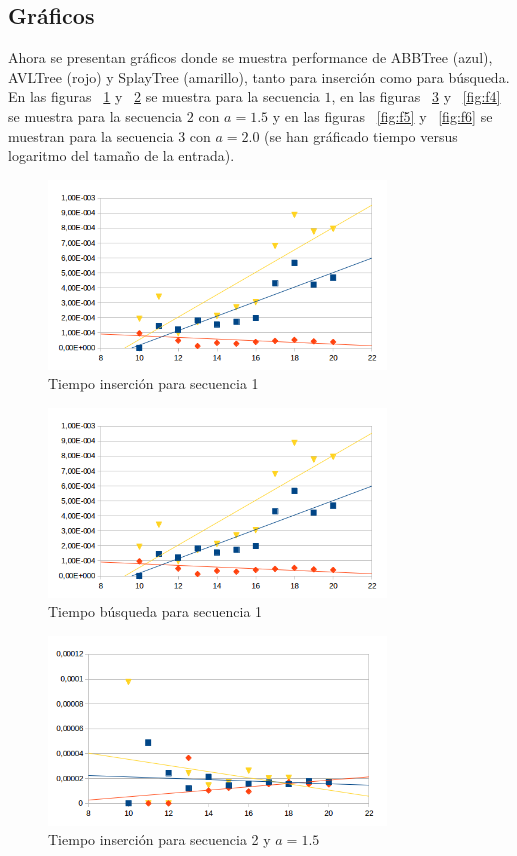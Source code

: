 \documentclass[letterpaper,12pt]{article}
\begin{document}
\newpage
\subsection{Gráficos}
Ahora se presentan gr\'aficos donde se muestra performance de ABBTree (azul), AVLTree (rojo) y SplayTree (amarillo), tanto para inserci\'on como para b\'usqueda. En las figuras ~\ref{fig:f1} y ~\ref{fig:f2} se muestra para la secuencia $1$, en las figuras ~\ref{fig:f3} y ~\ref{fig:f4} se muestra para la secuencia $2$ con $a=1.5$ y en las figuras ~\ref{fig:f5} y ~\ref{fig:f6} se muestran para la secuencia $3$ con $a=2.0$ (se han gráficado tiempo versus logaritmo del tamaño de la entrada).


\iftrue
\begin{figure}[bp!]
  \centering
    \includegraphics[width=0.8\textwidth]{freq1_ins}
  \caption{Tiempo inserci\'on para secuencia 1}
  \label{fig:f1}
\end{figure}

\begin{figure}[bp!]
  \centering
    \includegraphics[width=0.8\textwidth]{freq1_busq}
  \caption{Tiempo b\'usqueda para secuencia 1}
  \label{fig:f2}
\end{figure}

\begin{figure}[bp!]
  \centering
    \includegraphics[width=0.8\textwidth]{freq215_ins}
  \caption{Tiempo inserci\'on para secuencia 2 y $a=1.5$}
  \label{fig:f3}
\end{figure}
\end{document}

